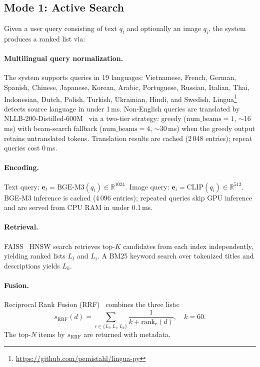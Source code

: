 \subsection{Mode 1: Active Search}
\label{ssec:active}

Given a user query consisting of text $q_t$ and optionally an image $q_i$,
the system produces a ranked list via:

\paragraph{Multilingual query normalization.}
The system supports queries in 19 languages: Vietnamese, French, German,
Spanish, Chinese, Japanese, Korean, Arabic, Portuguese, Russian, Italian,
Thai, Indonesian, Dutch, Polish, Turkish, Ukrainian, Hindi, and Swedish.
Lingua\footnote{\url{https://github.com/pemistahl/lingua-py}} detects source
language in under 1\,ms.
Non-English queries are translated by NLLB-200-Distilled-600M~\cite{costa2022nllb}
via a two-tier strategy: greedy ($\text{num\_beams}=1$, $\sim$16\,ms) with
beam-search fallback ($\text{num\_beams}=4$, $\sim$30\,ms) when the greedy
output retains untranslated tokens. Translation results are cached (2\,048
entries); repeat queries cost 0\,ms.

\paragraph{Encoding.}
Text query: $\mathbf{e}_t = \text{BGE-M3}(q_t) \in \mathbb{R}^{1024}$.
Image query: $\mathbf{e}_i = \text{CLIP}(q_i) \in \mathbb{R}^{512}$.
BGE-M3 inference is cached (4\,096 entries); repeated queries skip GPU
inference and are served from CPU RAM in under 0.1\,ms.

\paragraph{Retrieval.}
FAISS~\cite{johnson2019faiss} HNSW search retrieves top-$K$ candidates from each index independently,
yielding ranked lists $L_t$ and $L_i$.
A BM25 keyword search over tokenized titles and descriptions yields $L_k$.

\paragraph{Fusion.}
Reciprocal Rank Fusion (RRF)~\cite{cormack2009rrf} combines the three lists:
\begin{equation}
  s_{\text{RRF}}(d) = \sum_{r \in \{L_t, L_i, L_k\}}
  \frac{1}{k + \text{rank}_r(d)}, \quad k = 60.
  \label{eq:rrf}
\end{equation}
The top-$N$ items by $s_{\text{RRF}}$ are returned with metadata.


